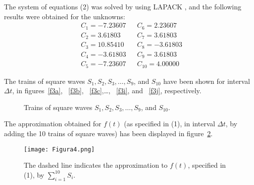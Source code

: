 \documentclass[11pt]{rMTA2010} \usepackage[utf8]{inputenc} \usepackage{graphicx} \usepackage{booktabs} \usepackage{array} \usepackage{enumerate}
\begin{document}
The system of equations (2) was solved by using LAPACK \cite{b4}, and the following results were obtained for the unknowns:
\begin{align*}
& C_1 = -7.23607  & & C_6 = 2.23607\\
& C_2 = 3.61803 & & C_7 = 3.61803\\
& C_3 = 10.85410 & & C_8 = -3.61803\\
& C_4 = -3.61803 & & C_9 = 3.61803\\
& C_5 = -7.23607 & & C_{10} = 4.00000
\end{align*}

The trains of square waves $S_1, S_2, S_3, \dots, S_9$, and $S_{10}$ have been shown for interval $\Delta t$, in figures~\ref{f3a}, ~\ref{f3b}, ~\ref{f3c},\dots, ~\ref{f3i}, and ~\ref{f3j}, respectively.

\begin{figure}[H]
\centering
{}\qquad
\caption[]{}
\end{figure}
\begin{figure}
\ContinuedFloat
{}\qquad
{}\qquad
\caption[]{}
\end{figure}
\begin{figure}
\ContinuedFloat
{}\qquad
{}\qquad
\caption[]{}
\end{figure}
\begin{figure}
\ContinuedFloat
{}\qquad
{}\qquad
\caption[]{}
\end{figure}
\begin{figure}
\ContinuedFloat
{}\qquad
{}\qquad
\caption[]{}
\end{figure}
\begin{figure}
\ContinuedFloat
{}\qquad
\caption{Trains of square waves $S_1, S_2, S_3, \dots, S_9$, and $S_{10}$.}
\label{f3}
\end{figure}
\newpage
The approximation obtained for $f(t)$ (as specified in (1), in interval $\Delta t$, by adding the 10 trains of square waves) has been displayed in figure~\ref{f4}.
\begin{figure}[H]
\centering
\texttt{[image: Figura4.png]}
\caption{The dashed line indicates the approximation to $f(t)$, specified in (1), by $\displaystyle\sum\limits_{i=1}^{10}S_ i$.}
\label{f4}
\end{figure}
\end{document}
